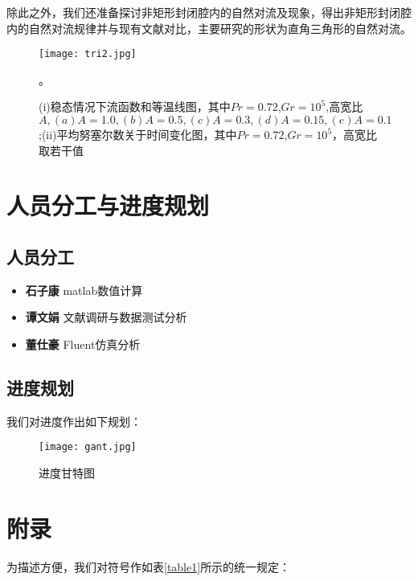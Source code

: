 \documentclass[UTF8]{article} %
\begin{document}
除此之外，我们还准备探讨非矩形封闭腔内的自然对流及现象，得出非矩形封闭腔内的自然对流规律并与现有文献对比，主要研究的形状为直角三角形的自然对流。
\begin{figure}[h]
  \centering
  \texttt{[image: tri2.jpg]}
  \caption{(i)稳态情况下流函数和等温线图，其中$Pr=0.72$,$Gr=10^5$,高宽比$A,(a)A=1.0,(b)A=0.5,(c)A=0.3,(d)A=0.15,(e)A=0.1$ \cite{tri2};(ii)平均努塞尔数关于时间变化图，其中$Pr=0.72$,$Gr=10^5$，高宽比取若干值 \cite{tri2}}。
  \label{fig:tri2}
\end{figure}

\section{人员分工与进度规划}
\subsection{人员分工}
\begin{itemize}
    \item \textbf{石子康}   matlab数值计算
    \item \textbf{谭文娟}   文献调研与数据测试分析
    \item \textbf{董仕豪}   Fluent仿真分析
\end{itemize}
\subsection{进度规划}
我们对进度作出如下规划：
\begin{figure}[h]
  \centering
  \texttt{[image: gant.jpg]}
  \caption{进度甘特图}
  \label{fig:gant}
\end{figure}

\newpage
\section{附录}
为描述方便，我们对符号作如表\ref{table1}所示的统一规定：
\end{document}
